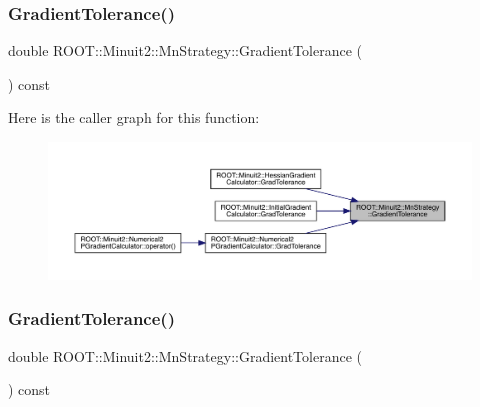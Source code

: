 \subsubsection{\texorpdfstring{GradientTolerance()}{GradientTolerance()}\hspace{0.1cm}{\footnotesize\ttfamily [1/2]}}
{\footnotesize\ttfamily double R\+O\+O\+T\+::\+Minuit2\+::\+Mn\+Strategy\+::\+Gradient\+Tolerance (\begin{DoxyParamCaption}{ }\end{DoxyParamCaption}) const\hspace{0.3cm}{\ttfamily [inline]}}

Here is the caller graph for this function\+:\nopagebreak
\begin{figure}[H]
\begin{center}
\leavevmode
\includegraphics[width=350pt]{da/de4/classROOT_1_1Minuit2_1_1MnStrategy_a94681b616c41570e2c81ef5c94cb81dd_icgraph}
\end{center}
\end{figure}
\mbox{\label{classROOT_1_1Minuit2_1_1MnStrategy_a94681b616c41570e2c81ef5c94cb81dd}} 
\subsubsection{\texorpdfstring{GradientTolerance()}{GradientTolerance()}\hspace{0.1cm}{\footnotesize\ttfamily [2/2]}}
{\footnotesize\ttfamily double R\+O\+O\+T\+::\+Minuit2\+::\+Mn\+Strategy\+::\+Gradient\+Tolerance (\begin{DoxyParamCaption}{ }\end{DoxyParamCaption}) const\hspace{0.3cm}{\ttfamily [inline]}}

\mbox{\label{classROOT_1_1Minuit2_1_1MnStrategy_a0b111848a04cb9b95615402c78709846}} 
